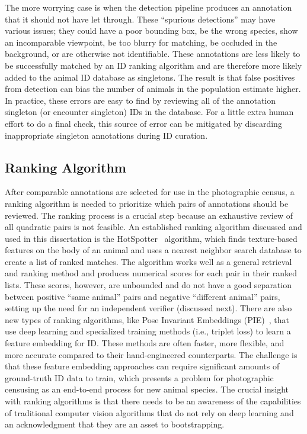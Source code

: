 The more worrying case is when the detection pipeline produces an annotation that it should not have let through.  These ``spurious detections'' may have various issues; they could have a poor bounding box, be the wrong species, show an incomparable viewpoint, be too blurry for matching, be occluded in the background, or are otherwise not identifiable.  These annotations are less likely to be successfully matched by an ID ranking algorithm and are therefore more likely added to the animal ID database as singletons.  The result is that false positives from detection can bias the number of animals in the population estimate higher.  In practice, these errors are easy to find by reviewing all of the annotation singleton (or encounter singleton) IDs in the database.  For a little extra human effort to do a final check, this source of error can be mitigated by discarding inappropriate singleton annotations during ID curation.

\subsection{Ranking Algorithm}

After comparable annotations are selected for use in the photographic census, a ranking algorithm is needed to prioritize which pairs of annotations should be reviewed.  The ranking process is a crucial step because an exhaustive review of all quadratic pairs is not feasible.  An established ranking algorithm discussed and used in this dissertation is the HotSpotter~\cite{crall_hotspotter_2013} algorithm, which finds texture-based features on the body of an animal and uses a nearest neighbor search database to create a list of ranked matches.  The algorithm works well as a general retrieval and ranking method and produces numerical scores for each pair in their ranked lists.  These scores, however, are unbounded and do not have a good separation between positive ``same animal'' pairs and negative ``different animal'' pairs, setting up the need for an independent verifier (discussed next).  There are also new types of ranking algorithms, like Pose Invariant Embeddings (PIE)~\cite{moskvyak_robust_2019}, that use deep learning and specialized training methods (i.e., triplet loss) to learn a feature embedding for ID.  These methods are often faster, more flexible, and more accurate compared to their hand-engineered counterparts.  The challenge is that these feature embedding approaches can require significant amounts of ground-truth ID data to train, which presents a problem for photographic censusing as an end-to-end process for new animal species.  The crucial insight with ranking algorithms is that there needs to be an awareness of the capabilities of traditional computer vision algorithms that do not rely on deep learning and an acknowledgment that they are an asset to bootstrapping.

